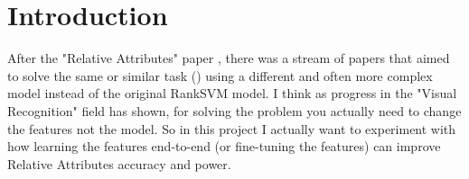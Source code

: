

\section{Introduction}

 After the "Relative Attributes" paper \cite{parikh2011}, there was a stream of papers that aimed to solve the same or similar task (\cite{Li2013,Yu2014,Sandeep_2014_CVPR,Lee_2013_7540}) using a different and often more complex model instead of the original RankSVM model. I think as progress in the "Visual Recognition" field has shown, for solving the problem you actually need to change the features not the model. So in this project I actually want to experiment with how learning the features end-to-end (or fine-tuning the features) can improve Relative Attributes accuracy and power. 

